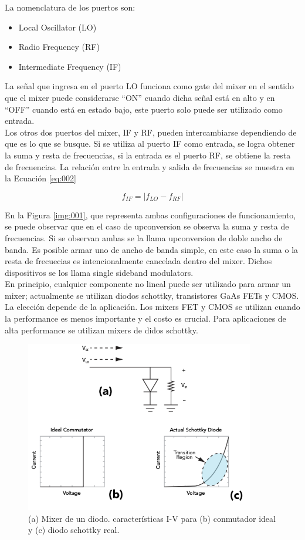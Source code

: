 \documentclass[a4paper,10pt]{article}
\begin{document}
	\indent La nomenclatura de los puertos son:
	\begin{itemize}
		\item Local Oscillator (LO)
		\item Radio Frequency (RF)
		\item Intermediate Frequency (IF)
	\end{itemize}

	\indent La señal que ingresa en el puerto LO funciona como gate del mixer 
	en el sentido que el mixer puede considerarse ``ON'' cuando dicha señal está
	en alto y en ``OFF'' cuando está en estado bajo, este puerto solo puede ser 
	utilizado como entrada. \\
	\indent Los otros dos puertos del mixer, IF y RF, pueden intercambiarse 
	dependiendo de que es lo que se busque. Si se utiliza al puerto IF como 
	entrada, se logra obtener la suma y resta de frecuencias, si la entrada es 
	el puerto RF, se obtiene la resta de frecuencias. La relación entre la 
	entrada y salida de frecuencias se muestra en la Ecuación \ref{eq:002}

	\begin{equation}\label{eq:002}
		f_{IF} = |f_{LO} - f_{RF}|
	\end{equation}

	\indent En la Figura \ref{img:001}, que representa ambas configuraciones de 
	funcionamiento, se puede observar que en el caso de upconversion se observa
	la suma y resta de frecuencias. Si se observan ambas se la llama 
	upconversion de doble ancho de banda. Es posible armar uno de ancho de banda
	simple, en este caso la suma o la resta de frecuecias es intencionalmente 
	cancelada dentro del mixer. Dichos dispositivos se los llama single sideband
	modulators. \\
	\indent En principio, cualquier componente no lineal puede ser utilizado 
	para armar un mixer; actualmente se utilizan diodos schottky, transistores 
	GaAs FETs y CMOS. La elección depende de la aplicación. Los mixers FET y 
	CMOS se utilizan cuando la performance es menos importante y el costo es 
	crucial. Para aplicaciones de alta performance se utilizan mixers de didos 
	schottky.
	
	\begin{figure}[!htb]
		\centering
		\includegraphics[width=10cm]
		{Images/OneDiodeMixer.png}
		\caption{(a) Mixer de un diodo. características I-V para (b)
		conmutador ideal y (c) diodo schottky real.}
		\label{img:002} 
	\end{figure}
\end{document}
